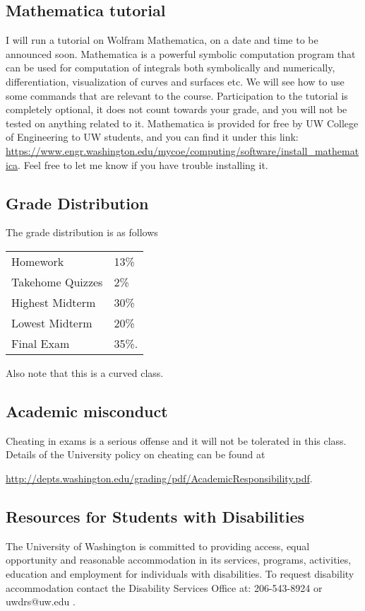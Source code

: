 \documentclass[11pt]{article}
\begin{document}
 \vspace{1mm}
 \subsection*{Mathematica tutorial}


I will run a tutorial on Wolfram Mathematica, on a date and time to be announced soon. Mathematica is a powerful symbolic computation program that can be used for computation of integrals both symbolically and numerically, differentiation, visualization of curves and surfaces etc. We will see how to use some commands that are relevant to the course. Participation to the tutorial is completely optional, it does not count towards your grade, and you will not be tested on anything related to it. Mathematica is provided for free by UW College of Engineering to UW students, and you can find it under this link: \url{https://www.engr.washington.edu/mycoe/computing/software/install_mathematica}. Feel free to let me know if you have trouble installing it.


\vspace{1mm}

\subsection*{Grade Distribution}
 \indent The grade distribution is as follows\\
\hspace*{40mm}
\begin{center}
\begin{tabular}{ l l }
Homework & 13\% \\
Takehome Quizzes & 2\%\\
Highest Midterm  & 30\% \\
Lowest Midterm  & 20\% \\
Final Exam  & 35\%.
\end{tabular}
\end{center}
Also note that this is a curved class.\\
\vspace{1mm}

\subsection*{Academic misconduct}
 Cheating in exams is a serious offense and it will not be tolerated in this class. Details of the University policy on cheating can be found at \begin{center}
 \url{http://depts.washington.edu/grading/pdf/AcademicResponsibility.pdf}.
 \end{center}
\vspace{1mm}
\subsection*{Resources for Students with Disabilities}
The University of Washington is committed to providing access, equal opportunity and reasonable accommodation in its services, programs, activities, education and employment for individuals with disabilities. To request disability accommodation contact the Disability Services Office at: 206-543-8924 or uwdrs@uw.edu .
\end{document}

